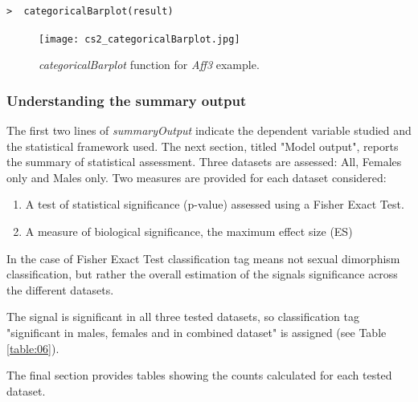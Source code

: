 \documentclass[12pt,a4paper]{article}
\begin{document}
\begingroup
    \fontsize{8pt}{12pt}\selectfont
\begin{verbatim}
>  categoricalBarplot(result)
\end{verbatim}
\endgroup 

\begin{figure}[H]%
\centerline{\texttt{[image: cs2\_categoricalBarplot.jpg]}}
\caption{\textit{categoricalBarplot} function for \textit{Aff3} example.}\label{fig:24}
\end{figure}

\subsubsection{Understanding the summary output}

The first two lines of \textit{summaryOutput} indicate the dependent variable studied and the statistical framework used.  
The next section, titled "Model output", reports the summary of statistical assessment. Three datasets are assessed: All, Females only and Males only. Two measures are provided for each dataset considered:
\begin{enumerate}
\item A test of statistical significance (p-value) assessed using a Fisher Exact Test. 
\item A measure of biological significance, the maximum effect size (ES)
\end{enumerate}

In the case of Fisher Exact Test classification tag means not sexual dimorphism classification, but rather the overall estimation of the signals significance across the different datasets.

The signal is significant in all three tested datasets, so classification tag "significant in males, females and in combined dataset" is assigned (see Table \ref{table:06}).
 
The final section provides tables showing the counts calculated for each tested dataset. 
\end{document}
